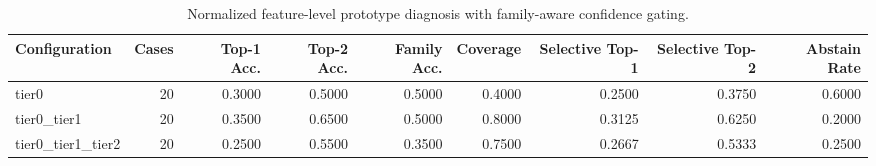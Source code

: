 \begin{table}[t]
\centering
\caption{Normalized feature-level prototype diagnosis with family-aware confidence gating.}
\label{tab:dice_stressor_hierarchical_diagnosis}
\footnotesize
\begin{tabular}{lrrrrrrrr}
\toprule
Configuration & Cases & Top-1 Acc. & Top-2 Acc. & Family Acc. & Coverage & Selective Top-1 & Selective Top-2 & Abstain Rate \\
\midrule
tier0 & 20 & 0.3000 & 0.5000 & 0.5000 & 0.4000 & 0.2500 & 0.3750 & 0.6000 \\
tier0_tier1 & 20 & 0.3500 & 0.6500 & 0.5000 & 0.8000 & 0.3125 & 0.6250 & 0.2000 \\
tier0_tier1_tier2 & 20 & 0.2500 & 0.5500 & 0.3500 & 0.7500 & 0.2667 & 0.5333 & 0.2500 \\
\bottomrule
\end{tabular}

\end{table}
